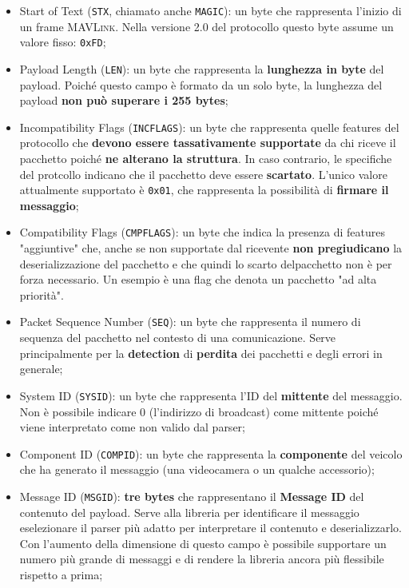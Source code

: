 \documentclass[a4paper, 12pt, oneside]{article}
\theoremstyle{definition}
\begin{document}
\begin{itemize}
    \item Start of Text (\texttt{STX}, chiamato anche \texttt{MAGIC}): un byte che rappresenta l'inizio di un frame \textsc{MAVLink}. Nella versione 2.0 del protocollo questo byte assume un valore fisso: \texttt{0xFD};
    \item Payload Length (\texttt{LEN}): un byte che rappresenta la \textbf{lunghezza in byte} del payload. Poiché questo campo è formato da un solo byte, la lunghezza del payload \textbf{non può superare i 255 bytes};
    \item Incompatibility Flags (\texttt{INCFLAGS}): un byte che rappresenta quelle features del protocollo che \textbf{devono essere tassativamente supportate} da chi riceve il pacchetto poiché \textbf{ne alterano la struttura}. In caso contrario, le specifiche del protcollo indicano che il pacchetto deve essere \textbf{scartato}. L'unico valore attualmente supportato è \texttt{0x01}, che rappresenta la possibilità di \textbf{firmare il messaggio};
    \item Compatibility Flags (\texttt{CMPFLAGS}): un byte che indica la presenza di features "aggiuntive" che, anche se non supportate dal ricevente \textbf{non pregiudicano} la deserializzazione del pacchetto e che quindi lo scarto delpacchetto non è per forza necessario. Un esempio è una flag che denota un pacchetto "ad alta priorità".
    \item Packet Sequence Number (\texttt{SEQ}): un byte che rappresenta il numero di sequenza del pacchetto nel contesto di una comunicazione. Serve principalmente per la \textbf{detection} di \textbf{perdita} dei pacchetti e degli errori in generale;
    \item System ID (\texttt{SYSID}): un byte che rappresenta l'ID del \textbf{mittente} del messaggio. Non è possibile indicare 0 (l'indirizzo di broadcast) come mittente poiché viene interpretato come non valido dal parser;
    \item Component ID (\texttt{COMPID}): un byte che rappresenta la \textbf{componente} del veicolo che ha generato il messaggio (una videocamera o un qualche accessorio);
    \item Message ID (\texttt{MSGID}): \textbf{tre bytes} che rappresentano il \textbf{Message ID} del contenuto del payload. Serve alla libreria per identificare il messaggio eselezionare il parser più adatto per interpretare il contenuto e deserializzarlo. Con l'aumento della dimensione di questo campo è possibile supportare un numero più grande di messaggi e di rendere la libreria ancora più flessibile rispetto a prima;

\end{itemize}
\end{document}

